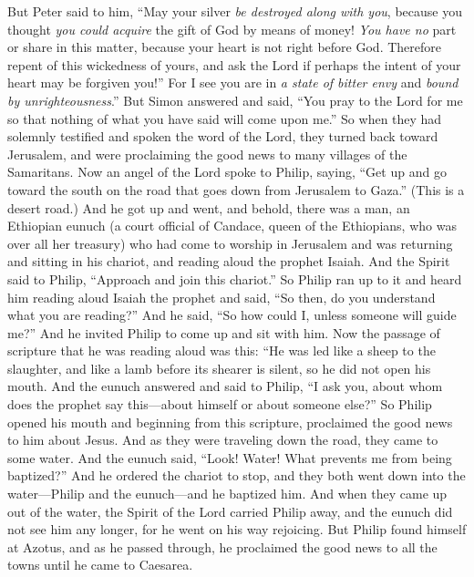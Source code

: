 \begin{biblechapter}
\verse But Peter said to him, “May your silver \textit{be destroyed along with you}, because you thought \textit{you could acquire} the gift of God by means of money!
\verse \textit{You have no} part or share in this matter, because your heart is not right before God.
\verse Therefore repent of this wickedness of yours, and ask the Lord if perhaps the intent of your heart may be forgiven you!”
\verse For I see you are in \textit{a state of bitter envy} and \textit{bound by unrighteousness}.”
\verse But Simon answered and said, “You pray to the Lord for me so that nothing of what you have said will come upon me.”
\verse So when they had solemnly testified and spoken the word of the Lord, they turned back toward Jerusalem, and were proclaiming the good news to many villages of the Samaritans.
 Now an angel of the Lord spoke to Philip, saying, “Get up and go toward the south on the road that goes down from Jerusalem to Gaza.” (This is a desert road.)
\verse And he got up and went, and behold, there was a man, an Ethiopian eunuch (a court official of Candace, queen of the Ethiopians, who was over all her treasury) who had come to worship in Jerusalem
\verse and was returning and sitting in his chariot, and reading aloud the prophet Isaiah.
\verse And the Spirit said to Philip, “Approach and join this chariot.”
\verse So Philip ran up to it and heard him reading aloud Isaiah the prophet and said, “So then, do you understand what you are reading?”
\verse And he said, “So how could I, unless someone will guide me?” And he invited Philip to come up and sit with him.
\verse Now the passage of scripture that he was reading aloud was this:
\verse “He was led like a sheep to the slaughter, 
and like a lamb before its shearer is silent, 
so he did not open his mouth.
\verse And the eunuch answered and said to Philip, “I ask you, about whom does the prophet say this—about himself or about someone else?”
\verse So Philip opened his mouth and beginning from this scripture, proclaimed the good news to him about Jesus.
\verse And as they were traveling down the road, they came to some water. And the eunuch said, “Look! Water! What prevents me from being baptized?”
\verse And he ordered the chariot to stop, and they both went down into the water—Philip and the eunuch—and he baptized him.
\verse And when they came up out of the water, the Spirit of the Lord carried Philip away, and the eunuch did not see him any longer, for he went on his way rejoicing.
\verse But Philip found himself at Azotus, and as he passed through, he proclaimed the good news to all the towns until he came to Caesarea.
\end{biblechapter}

